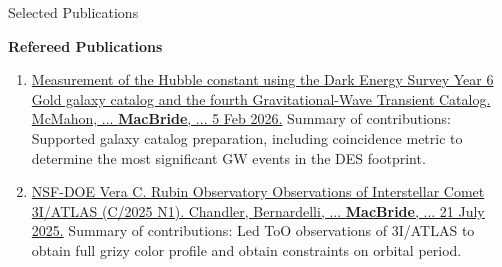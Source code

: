 \begin{rSection}{Selected Publications}


\textbf{Refereed Publications}
\begin{enumerate}
    \item \href{https://arxiv.org/pdf/2602.04766}{Measurement of the Hubble constant using the Dark Energy Survey Year 6 Gold galaxy catalog and the fourth Gravitational-Wave Transient Catalog. McMahon, ... \textbf{MacBride}, ... 5 Feb 2026.} Summary of contributions: Supported galaxy catalog preparation, including coincidence metric to determine the most significant \ac{GW} events in the DES footprint.
    \item \href{https://arxiv.org/pdf/2507.13409}{NSF-DOE Vera C. Rubin Observatory Observations of Interstellar Comet 3I/ATLAS (C/2025 N1). Chandler, Bernardelli, ... \textbf{MacBride}, ... 21 July 2025.} Summary of contributions: Led \ac{ToO} observations of 3I/ATLAS to obtain full grizy color profile and obtain constraints on orbital period.
\end{enumerate}


\end{rSection}
